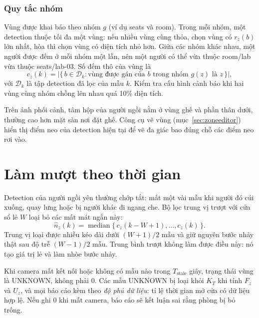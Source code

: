 \documentclass[10pt,a4paper,oneside,openany]{report}
\newcommand{\breakus}{\textunderscore\allowbreak}
\newcommand{\code}[1]{{\ttfamily\let\_\breakus #1}}
\begin{document}
\subsubsection{Quy tắc nhóm}
Vùng được khai báo theo nhóm $g$ (ví dụ \code{seats} và \code{room}). Trong mỗi nhóm, một detection thuộc tối đa một vùng:
nếu nhiều vùng cùng thỏa, chọn vùng có $r_z(b)$ lớn nhất, hòa thì chọn vùng có diện tích nhỏ hơn. Giữa các nhóm khác nhau,
một người được đếm ở mỗi nhóm một lần, nên một người có thể vừa thuộc \code{room/lab} vừa thuộc \code{seats/lab-03}.
Số đếm thô của vùng là
\begin{equation}
  c_z(k) = \bigl|\{\, b \in \mathcal{D}_k : \text{vùng được gán của } b \text{ trong nhóm } g(z) \text{ là } z \,\}\bigr|,
\end{equation}
với $\mathcal{D}_k$ là tập detection đã lọc của mẫu $k$. Kiểm tra cấu hình cảnh báo khi hai vùng cùng nhóm chồng lên nhau quá 10\% diện tích.

\begin{meo}
Trên ảnh phối cảnh, tâm hộp của người ngồi nằm ở vùng ghế và phần thân dưới, thường cao hơn mặt sàn nơi đặt ghế. Công cụ vẽ vùng
(mục~\ref{sec:zoneeditor}) hiển thị điểm neo của detection hiện tại để vẽ đa giác bao đúng chỗ các điểm neo rơi vào.
\end{meo}

\section{Làm mượt theo thời gian}\label{sec:lammuot}
Detection của người ngồi yên thường chớp tắt: mất một vài mẫu khi người đó cúi xuống, quay lưng hoặc bị người khác đi ngang che.
Bộ lọc trung vị trượt với cửa sổ lẻ $W$ loại bỏ các mất mát ngắn này:
\begin{equation}
  \hat n_z(k) = \operatorname{median}\bigl\{\, c_z(k-W+1), \dots, c_z(k) \,\bigr\}.
\end{equation}
Trung vị loại được nhiễu kéo dài dưới $(W+1)/2$ mẫu và giữ nguyên bước nhảy thật sau độ trễ $(W-1)/2$ mẫu. Trung bình trượt
không làm được điều này: nó tạo giá trị lẻ và làm nhòe bước nhảy.

\begin{chuy}
Khi camera mất kết nối hoặc không có mẫu nào trong $T_{\text{stale}}$ giây, trạng thái vùng là \code{UNKNOWN}, không phải 0.
Các mẫu \code{UNKNOWN} bị loại khỏi $K_T$ khi tính $F_z$ và $U_z$, và mọi báo cáo kèm theo \emph{độ phủ dữ liệu}: tỉ lệ thời gian mở cửa
có dữ liệu hợp lệ. Nếu ghi 0 khi mất camera, báo cáo sẽ kết luận sai rằng phòng bị bỏ trống.
\end{chuy}
\end{document}
